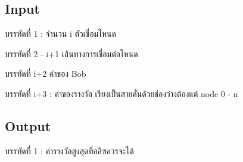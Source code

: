 \documentclass{article}
\begin{document}
\subsection*{Input}
บรรทัดที่ 1 : จำนวน i ตัวเชื่อมโหนด



บรรทัดที่ 2 - i+1 เส้นทางการเชื่อมต่อโหนด



บรรทัดที่ i+2 ค่าของ Bob



บรรทัดที่ i+3 : ค่าของรางวัล เรียงเป็นสายคั่นด้วยช่องว่างต้องแต่ node 0 - n



\subsection*{Output}
บรรทัดที่ 1 : ค่ารางวัลสูงสุดที่อลิซควรจะได้
\end{document}
